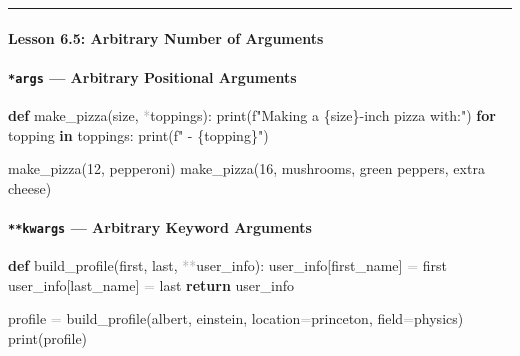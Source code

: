 \documentclass[
  justified,
  openright,
]{tufte-book}
\let\subsection\paragraph
\let\paragraph\paragraph
\newcommand{\KeywordTok}[1]{\textcolor{CodeKeyword}{\textbf{#1}}}  %
\newcommand{\StringTok}[1]{\textcolor{CodeString}{#1}}              %
\newcommand{\CodeNumTok}[1]{\textcolor{CodeNumber}{#1}}             %
\newcommand{\OperatorTok}[1]{\textcolor{DarkGray}{#1}}              %
\newenvironment{Shaded}{%
  \begin{mdframed}[style=TufteCode]%
}{%
  \end{mdframed}%
}
\let\subsection\paragraph
\let\paragraph\paragraph
\begin{document}
\begin{center}\rule{0.5\linewidth}{0.5pt}\end{center}

\subsection{Lesson 6.5: Arbitrary Number of
Arguments}\label{lesson-6.5-arbitrary-number-of-arguments}

\subsection{\texorpdfstring{\texttt{*args} --- Arbitrary Positional
Arguments}{*args --- Arbitrary Positional Arguments}}\label{args-arbitrary-positional-arguments}

\begin{Shaded}
\begin{Highlighting}[]
\KeywordTok{def} make\_pizza(size, \OperatorTok{*}toppings):
    print(\StringTok{f"Making a }\StringTok{\{}size\StringTok{\}}\StringTok{{-}inch pizza with:"})
    \KeywordTok{for} topping \KeywordTok{in} toppings:
        print(\StringTok{f"  {-} }\StringTok{\{}topping\StringTok{\}}\StringTok{"})
 
make\_pizza(\CodeNumTok{12}, \StringTok{\textquotesingle{}pepperoni\textquotesingle{}})
make\_pizza(\CodeNumTok{16}, \StringTok{\textquotesingle{}mushrooms\textquotesingle{}}, \StringTok{\textquotesingle{}green peppers\textquotesingle{}}, \StringTok{\textquotesingle{}extra cheese\textquotesingle{}})
\end{Highlighting}
\end{Shaded}

\subsection{\texorpdfstring{\texttt{**kwargs} --- Arbitrary Keyword
Arguments}{**kwargs --- Arbitrary Keyword Arguments}}\label{kwargs-arbitrary-keyword-arguments}

\begin{Shaded}
\begin{Highlighting}[]
\KeywordTok{def} build\_profile(first, last, \OperatorTok{**}user\_info):
    user\_info[\StringTok{\textquotesingle{}first\_name\textquotesingle{}}] \OperatorTok{=} first
    user\_info[\StringTok{\textquotesingle{}last\_name\textquotesingle{}}] \OperatorTok{=} last
    \KeywordTok{return} user\_info
 
profile \OperatorTok{=} build\_profile(\StringTok{\textquotesingle{}albert\textquotesingle{}}, \StringTok{\textquotesingle{}einstein\textquotesingle{}},
                        location\OperatorTok{=}\StringTok{\textquotesingle{}princeton\textquotesingle{}},
                        field\OperatorTok{=}\StringTok{\textquotesingle{}physics\textquotesingle{}})
print(profile)
\end{Highlighting}
\end{Shaded}
\end{document}
